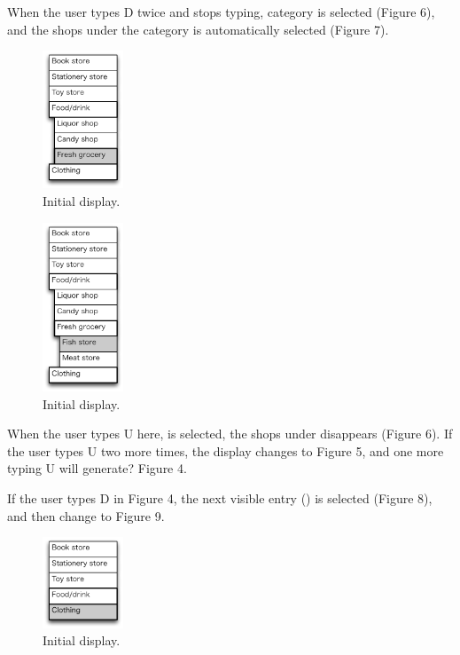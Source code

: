 \documentclass{article}
\begin{document}
When the user types D twice and stops typing,
 category is selected (Figure 6), and
the shops under the category is automatically selected (Figure 7).

\begin{figure}[H]
\centerline{\includegraphics[width=24mm,bb=0 0 139 238]{figures/fig6.pdf}}
\caption{Initial display.}
\label{fig6}
\end{figure}

\begin{figure}[H]
\centerline{\includegraphics[width=24mm,bb=0 0 139 292]{figures/fig7.pdf}}
\caption{Initial display.}
\label{fig7}
\end{figure}

When the user types U here,  is selected,
the shops under  disappears (Figure 6).
If the user types U two more times, the display changes to Figure 5,
and one more typing U will generate? Figure 4.

If the user types D in Figure 4, the next visible entry
() is selected (Figure 8), and then change to Figure 9.

\begin{figure}[H]
\centerline{\includegraphics[width=24mm,bb=0 0 139 157]{figures/fig8.pdf}}
\caption{Initial display.}
\label{fig8}
\end{figure}
\end{document}
